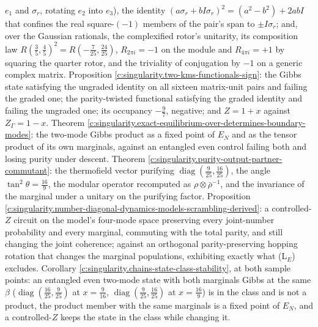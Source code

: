 \documentclass[11pt]{article}
\theoremstyle{definition}
\theoremstyle{plain}
\providecommand{\EN}{}\renewcommand{\EN}{E_{N}}
\begin{document}
$e_1$ and $\sigma_r$, rotating $e_2$ into $e_3$), the identity $(a\sigma_r + bI\sigma_r)^{2} = (a^{2} - b^{2}) + 2abI$ that confines the real square-$(-1)$ members of the pair's span to $\pm I\sigma_r$; and, over the Gaussian rationals, the complexified rotor's unitarity, its composition law $R(\tfrac35,\tfrac45)^{2} = R(-\tfrac{7}{25},\tfrac{24}{25})$, $R_{2\pi i} = -1$ on the module and $R_{4\pi i} = +1$ by squaring the quarter rotor, and the triviality of conjugation by $-1$ on a generic complex matrix. Proposition \ref{c:singularity.two-kms-functionals-sign}: the Gibbs state satisfying the ungraded identity on all sixteen matrix-unit pairs and failing the graded one; the parity-twisted functional satisfying the graded identity and failing the ungraded one; its occupancy $-\tfrac{9}{7}$, negative; and $Z = 1 + x$ against $Z_\Gamma = 1 - x$. Theorem \ref{c:singularity.exact-equilibrium-over-determines-boundary-modes}: the two-mode Gibbs product as a fixed point of $\EN$ and as the tensor product of its own marginals, against an entangled even control failing both and losing purity under descent. Theorem \ref{c:singularity.purity-output-partner-commutant}: the thermofield vector purifying $\operatorname{diag}(\tfrac{9}{25},\tfrac{16}{25})$, the angle $\tan^{2}\theta = \tfrac{16}{9}$, the modular operator recomputed as $\rho\otimes\bar\rho^{-1}$, and the invariance of the marginal under a unitary on the purifying factor. Proposition \ref{c:singularity.number-diagonal-dynamics-models-scrambling-derived}: a controlled-$Z$ circuit on the model's four-mode space preserving every joint-number probability and every marginal, commuting with the total parity, and still changing the joint coherence; against an orthogonal parity-preserving hopping rotation that changes the marginal populations, exhibiting exactly what (L$_E$) excludes. Corollary \ref{c:singularity.chains-state-class-stability}, at both sample points: an entangled even two-mode state with both marginals Gibbs at the same $\beta$ ($\operatorname{diag}(\tfrac{16}{25}, \tfrac{9}{25})$ at $x = \tfrac{9}{16}$, $\operatorname{diag}(\tfrac{9}{25}, \tfrac{16}{25})$ at $x = \tfrac{16}{9}$) is in the class and is not a product, the product member with the same marginals is a fixed point of $\EN$, and a controlled-$Z$ keeps the state in the class while changing it.
\end{document}
